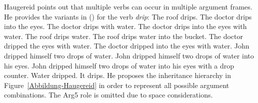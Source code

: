 \begin{exe}
\begin{xlist}[iv.]
\begin{exe}
\begin{xlist}[iv.]
\noindent
Haugereid points out that multiple verbs can occur in multiple argument frames. He provides the variants in ()
for the verb \emph{drip}:
\eal
\settowidth{}
\ex The roof drips.                    
\ex The doctor drips into the eyes.    
\ex The doctor drips with water.       
\ex The doctor drips into the eyes with water. 
\ex The roof drips water.                      
\ex The roof drips water into the bucket.      
\ex The doctor dripped the eyes with water.    
\ex The doctor dripped into the eyes with water. 
\ex John dripped himself two drops of water.     
\ex John dripped himself two drops of water into his eyes. 
\ex John dripped himself two drops of water into his eyes with a drop counter. 
\ex Water dripped. 
\ex It drips. 
\zl
He proposes the inheritance hierarchy in Figure~\ref{Abbildung-Haugereid} in order to represent all
possible argument combinations. The Arg5 role is omitted due to space considerations.


\end{xlist}
\end{exe}
\end{xlist}
\end{exe}
